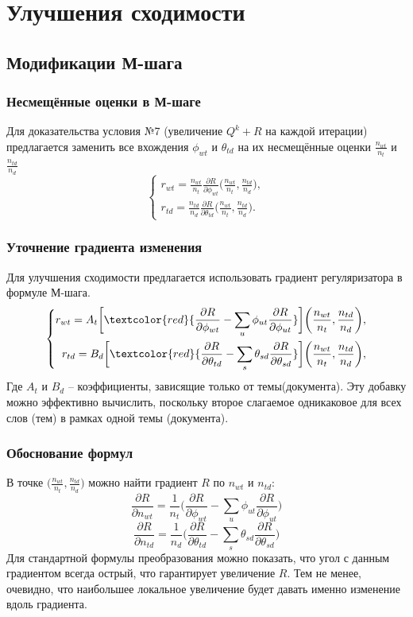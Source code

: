 \documentclass[utf8]{beamer}
\begin{document}
	\section{Улучшения сходимости}
	\subsection{Модификации М-шага}
	
	\begin{frame}
		\frametitle{Несмещённые оценки в  М-шаге}
Для доказательства условия №7 (увеличение $Q^k+R$ на каждой итерации) предлагается заменить все вхождения $\phi_{wt}$ и $\theta_{td}$ на их несмещённые оценки $\frac{n_{wt}}{n_t}$ и $\frac{n_{td}}{n_d}$
\[
\left\{
	\begin{aligned}
		r_{wt} =  \frac{n_{wt}}{n_t} \frac{\partial{R}}{\partial{\phi_{wt}}} \bigg(\frac{n_{wt}}{n_t}, \frac{n_{td}}{n_d}\bigg),\\
		r_{td} = \frac{n_{td}}{n_d} \frac{\partial{R}}{\partial{\theta_{td}}} \bigg(\frac{n_{wt}}{n_t}, \frac{n_{td}}{n_d}\bigg).
	\end{aligned}
\right.
\]
	\end{frame}

	
	\begin{frame}
		\frametitle{Уточнение градиента изменения}
		Для улучшения сходимости предлагается использовать градиент регуляризатора в формуле М-шага.
\[
\left\{
	\begin{aligned}
		r_{wt} =  A_t \bigg[\textcolor{red} {\frac{\partial{R}}{\partial{\phi_{wt}}} - \sum\limits_u \phi_{ut} \frac{\partial{R}}{\partial{\phi_{ut}}} }\bigg] \bigg(\frac{n_{wt}}{n_t}, \frac{n_{td}}{n_d}\bigg),\\
		r_{td} =  B_d \bigg[ \textcolor{red} {\frac{\partial{R}}{\partial{\theta_{td}}} - \sum\limits_s \theta_{sd} \frac{\partial{R}}{\partial{\theta_{sd}}} }\bigg] \bigg(\frac{n_{wt}}{n_t}, \frac{n_{td}}{n_d}\bigg),
	\end{aligned}
\right.
\]
Где $A_t$ и $B_d$ -- коэффициенты, зависящие только от темы(документа). Эту добавку можно эффективно вычислить, поскольку второе слагаемое одникаковое для всех слов (тем) в рамках одной темы (документа).
	\end{frame}

\begin{frame}
		\frametitle{Обоснование формул}
В точке  $\big( \frac{n_{wt}}{n_t}, \frac{n_{td}}{n_d}\big)$ можно найти градиент $R$ по $n_{wt}$ и $n_{td}$:
\[
\frac{\partial{R}}{\partial{n_{wt}}} = \frac{1}{n_t} \bigg(\frac{\partial{R}}{\partial{\phi_{wt}}} - \sum\limits_u \phi_{ut} \frac{\partial{R}}{\partial{\phi_{ut}}}\bigg)
\]
\[
\frac{\partial{R}}{\partial{n_{td}}} = \frac{1}{n_d} \bigg( \frac{\partial{R}}{\partial{\theta_{td}}} - \sum\limits_s \theta_{sd} \frac{\partial{R}}{\partial{\theta_{sd}}} \bigg)
\]
Для стандартной формулы преобразования можно показать, что угол с данным градиентом всегда острый, что гарантирует увеличение $R$. Тем не менее, очевидно, что наибольшее локальное увеличение будет давать именно изменение вдоль градиента.
	\end{frame}
\end{document}
